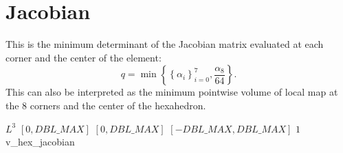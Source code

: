 \section{Jacobian}

This is the minimum determinant of the Jacobian matrix evaluated at each corner and the center of the element:
\[
q = \min\left\{\left\{\alpha_i\right\}_{i=0}^7, \frac{\alpha_8}{64} \right\}.
\]
This can also be interpreted as the minimum pointwise volume of local map
at the 8 corners and the center of the hexahedron.

%
{$L^3$}%
{$[0,DBL\_MAX]$}%
{$[0,DBL\_MAX]$}%
{$[-DBL\_MAX,DBL\_MAX]$}%
{$1$}%
{\cite{knu:00}}%
{v\_hex\_jacobian}%
